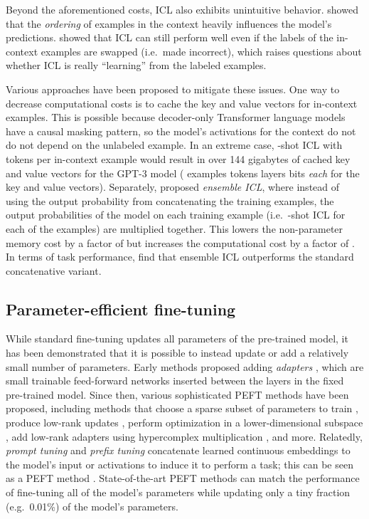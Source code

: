 \documentclass{article}
\begin{document}
Beyond the aforementioned costs, ICL also exhibits unintuitive behavior.
\citet{zhao2021calibrate} showed that the \textit{ordering} of examples in the context heavily influences the model's predictions. 
\citet{min2022rethinking} showed that ICL can still perform well even if the labels of the in-context examples are swapped (i.e.\ made incorrect), which raises questions about whether ICL is really ``learning'' from the labeled examples. 

Various approaches have been proposed to mitigate these issues.
One way to decrease computational costs is to cache the key and value vectors for in-context examples.
This is possible because decoder-only Transformer language models have a causal masking pattern, so the model's activations for the context do not do not depend on the unlabeled example.
In an extreme case, -shot ICL with  tokens per in-context example would result in over 144 gigabytes of cached key and value vectors for the GPT-3 model ( examples  tokens  layers  bits \textit{each} for the key and value vectors).
Separately, \citet{min2021noisy} proposed \textit{ensemble ICL}, where instead of using the output probability from concatenating the  training examples, the output probabilities of the model on each training example (i.e.\ -shot ICL for each of the  examples) are multiplied together.
This lowers the non-parameter memory cost by a factor of  but increases the computational cost by a factor of .
In terms of task performance, \citet{min2021noisy} find that ensemble ICL outperforms the standard concatenative variant.

\subsection{Parameter-efficient fine-tuning}

While standard fine-tuning updates all parameters of the pre-trained model, it has been demonstrated that it is possible to instead update or add a relatively small number of parameters.
Early methods proposed adding \textit{adapters} \cite{rebuffi2017learning,Houlsby2019ParameterEfficientTL,bapna2019simple}, which are small trainable feed-forward networks inserted between the layers in the fixed pre-trained model.
Since then, various sophisticated PEFT methods have been proposed, including methods that choose a sparse subset of parameters to train \cite{guo2020parameter,sung2021training}, produce low-rank updates \cite{hu2021lora}, perform optimization in a lower-dimensional subspace \cite{aghajanyan2020intrinsic}, add low-rank adapters using hypercomplex multiplication \cite{mahabadi2021compacter}, and more.
Relatedly, \textit{prompt tuning} \cite{lester2021power} and \textit{prefix tuning} \cite{li2021prefix} concatenate learned continuous embeddings to the model's input or activations to induce it to perform a task; this can be seen as a PEFT method \cite{he2021towards}.
State-of-the-art PEFT methods can match the performance of fine-tuning all of the model's parameters while updating only a tiny fraction (e.g.\ 0.01\%) of the model's parameters.
\end{document}

